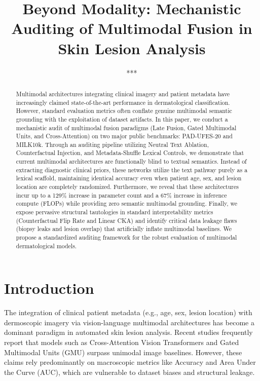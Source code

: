 \documentclass[runningheads]{llncs}
\begin{document}
%
\title{Beyond Modality: Mechanistic Auditing of Multimodal Fusion in Skin Lesion Analysis}

\author{***}
\authorrunning{***}
\institute{***}

\maketitle
%
\begin{abstract}
Multimodal architectures integrating clinical imagery and patient metadata have increasingly claimed state-of-the-art performance in dermatological classification. However, standard evaluation metrics often conflate genuine multimodal semantic grounding with the exploitation of dataset artifacts. In this paper, we conduct a mechanistic audit of multimodal fusion paradigms (Late Fusion, Gated Multimodal Units, and Cross-Attention) on two major public benchmarks: PAD-UFES-20 and MILK10k. Through an auditing pipeline utilizing Neutral Text Ablation, Counterfactual Injection, and Metadata-Shuffle Lexical Controls, we demonstrate that current multimodal architectures are functionally blind to textual semantics. Instead of extracting diagnostic clinical priors, these networks utilize the text pathway purely as a lexical scaffold, maintaining identical accuracy even when patient age, sex, and lesion location are completely randomized. Furthermore, we reveal that these architectures incur up to a 129\% increase in parameter count and a 67\% increase in inference compute (FLOPs) while providing zero semantic multimodal grounding. Finally, we expose pervasive structural tautologies in standard interpretability metrics (Counterfactual Flip Rate and Linear CKA) and identify critical data leakage flaws (biopsy leaks and lesion overlap) that artificially inflate multimodal baselines. We propose a standardized auditing framework for the robust evaluation of multimodal dermatological models.

\end{abstract}

%
\section{Introduction}

The integration of clinical patient metadata (e.g., age, sex, lesion location) with dermoscopic imagery via vision-language multimodal architectures has become a dominant paradigm in automated skin lesion analysis. Recent studies frequently report that models such as Cross-Attention Vision Transformers and Gated Multimodal Units (GMU) surpass unimodal image baselines. However, these claims rely predominantly on macroscopic metrics like Accuracy and Area Under the Curve (AUC), which are vulnerable to dataset biases and structural leakage.
\end{document}
